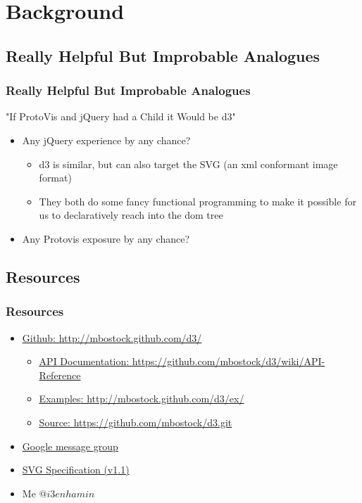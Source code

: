 \documentclass{beamer}
\begin{document}
\section{Background}

\subsection{Really Helpful But Improbable Analogues}

\begin{frame}
    \frametitle{Really Helpful But Improbable Analogues}
    \begin{block}{"If ProtoVis and jQuery had a Child it Would be d3"}
\pause
        \begin{itemize}
        \item Any jQuery experience by any chance?
\pause
            \begin{itemize}
            \item d3 is similar, but can also target the SVG (an xml conformant image format)
\pause
            \item They both do some fancy functional programming to make it possible 
                  for us to declaratively reach into the dom tree
            \end{itemize}
\pause
       \item Any Protovis exposure by any chance?
       \end{itemize}
    \end{block}
\end{frame}



\subsection{Resources}

\begin{frame}
    \frametitle{Resources}
\pause
        \begin{itemize}
        \item \href{http://mbostock.github.com/d3/}{\underline{Github}: http://mbostock.github.com/d3/}
\pause
            \begin{itemize}
            \item \href{https://github.com/mbostock/d3/wiki/API-Reference}{\underline{API Documentation}: https://github.com/mbostock/d3/wiki/API-Reference}
\pause
            \item \href{http://mbostock.github.com/d3/ex/}{\underline{Examples}: http://mbostock.github.com/d3/ex/}
\pause
            \item \href{https://github.com/mbostock/d3.git}{\underline{Source}: https://github.com/mbostock/d3.git}
            \end{itemize}
\pause
        \item \href{http://groups.google.com/group/d3-js?pli=1}{Google message group}
\pause
        \item \href{http://www.w3.org/TR/SVG/}{SVG Specification (v1.1)}
\pause
        \item Me $@i3enhamin$
        \end{itemize}
\end{frame}
\end{document}
